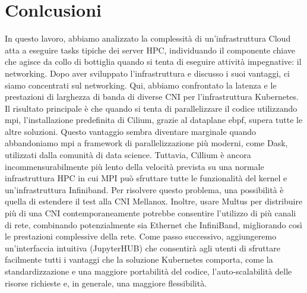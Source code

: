 \section*{Conlcusioni}

In questo lavoro, abbiamo analizzato la complessità di un'infrastruttura Cloud
atta a eseguire tasks tipiche dei server HPC, individuando il componente chiave
che agisce da collo di bottiglia quando si tenta di eseguire attività
impegnative: il networking.
Dopo aver sviluppato l'infrastruttura e discusso i suoi vantaggi, ci siamo
concentrati sul networking.
Qui, abbiamo confrontato la latenza e le prestazioni di larghezza di banda di
diverse CNI per l'infrastruttura Kubernetes.
Il risultato principale è che quando si tenta di parallelizzare il codice
utilizzando mpi, l'installazione predefinita di Cilium, grazie al dataplane
ebpf, supera tutte le altre soluzioni.
Questo vantaggio sembra diventare marginale quando abbandoniamo mpi a framework
di parallelizzazione più moderni, come Dask, utilizzati dalla comunità di data
science.
Tuttavia, Cillium è ancora incommensurabilmente più lento della velocità
prevista su una normale infrastruttura HPC in cui MPI può sfruttare tutte le
funzionalità del kernel e un'infrastruttura Infiniband.
Per risolvere questo problema, una possibilità è quella di estendere il test
alla CNI Mellanox. Inoltre, usare Multus per distribuire più di una CNI
contemporaneamente potrebbe consentire l'utilizzo di più canali di rete,
combinando potenzialmente sia Ethernet che InfiniBand, migliorando così le
prestazioni complessive della rete.
Come passo successivo, aggiungeremo un'interfaccia intuitiva (JupyterHUB) che
consentirà agli utenti di sfruttare facilmente tutti i vantaggi che la soluzione
Kubernetes comporta, come la standardizzazione e una maggiore portabilità del
codice, l'auto-scalabilità delle risorse richieste e, in generale, una maggiore
flessibilità.
